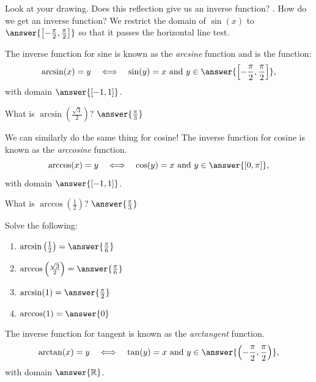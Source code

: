\documentclass{ximera}
\begin{document}
Look at your drawing. Does this reflection give us an inverse function? . How do we get an inverse function?
We restrict the domain of $\sin(x)$ to $\answer{\left[-\frac{\pi}{2},\frac{\pi}{2}\right]}$ so that it passes the horizontal line test.

The inverse function for sine is known as the \emph{arcsine} function and is the function:
\[
\arcsin(x)=y \quad\Longleftrightarrow\quad \sin(y)=x \text{ and } y\in\answer{\left[-\frac{\pi}{2},\frac{\pi}{2}\right]},
\]
with domain $\answer{[-1,1]}$.

\begin{example}\label{example:2-5}
What is $\arcsin \left(\frac{\sqrt{3}}{2}\right)$? $\answer{\frac{\pi}{3}}$
\end{example}

We can similarly do the same thing for cosine! The inverse function for cosine is known as the \emph{arccosine} function.
\[
\arccos(x)=y \quad\Longleftrightarrow\quad \cos(y)=x \text{ and } y\in\answer{[0,\pi]},
\]
with domain $\answer{[-1,1]}$.

\begin{example}\label{example:2-6}
What is $\arccos \left(\frac{1}{2}\right)$? $\answer{\frac{\pi}{3}}$
\end{example}

\begin{exercise}\label{exercise:2-7}
Solve the following:
\begin{enumerate}
  \item $\arcsin \left(\frac{1}{2}\right)=\answer{\frac{\pi}{6}}$
  \item $\arccos \left(\frac{\sqrt{3}}{2}\right)=\answer{\frac{\pi}{6}}$
  \item $\arcsin (1)=\answer{\frac{\pi}{2}}$
  \item $\arccos (1)=\answer{0}$
\end{enumerate}
\end{exercise}

The inverse function for tangent is known as the \emph{arctangent} function.
\[
\arctan(x)=y \quad\Longleftrightarrow\quad \tan(y)=x \text{ and } y\in\answer{\left(-\frac{\pi}{2},\frac{\pi}{2}\right)},
\]
with domain $\answer{\mathbb{R}}$.
\end{document}
